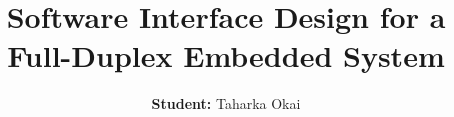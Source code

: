 

\usepackage[T1]{fontenc}
\usepackage{lmodern}
\usepackage[size=a1,scale=1.0]{beamerposter}


\usepackage{graphicx}
\usepackage{booktabs}
\usepackage{tikz}
\usepackage{pgfplots}
\pgfplotsset{compat=1.17}
\usepackage{multicol}
\usepackage{caption}
\captionsetup{font=normalsize}

\newcommand{\ncols}{3}
\newlength{\sepwidth}
\newlength{\colwidth}
\newlength{\midspace}
\setlength{\sepwidth}{0.020\paperwidth}
\setlength{\colwidth}{
{\dimexpr \paperwidth / \ncols \relax} -
{\dimexpr \sepwidth + \sepwidth / \ncols \relax}
}
\setlength{\midspace}{20ex}

\newcommand{\separatorcolumn}{\begin{column}{\sepwidth}\end{column}}


\title{Software Interface Design for a Full-Duplex Embedded System}

\author{\textbf{Student:} Taharka Okai}


\newcommand{\beamerblocknoheader}{
  \setbeamertemplate{block begin}{
    {\parskip0pt\par}
    \usebeamerfont{block body}
    \vskip-0.5ex
    \begin{beamercolorbox}[colsep*=0ex]{block body}
    \justifying
    \setlength{\parskip}{1ex}
    \vskip-2ex
  }

  \setbeamertemplate{block alerted begin}{
    {\parskip0pt\par}
    \usebeamerfont{block body}
    \vskip-0.5ex
    \begin{beamercolorbox}[colsep*=0ex]{block alerted body}
    \justifying
    \begin{adjustwidth}{1ex}{1ex}
    \setlength{\parskip}{1ex}
    \vskip-2ex
  }
}

